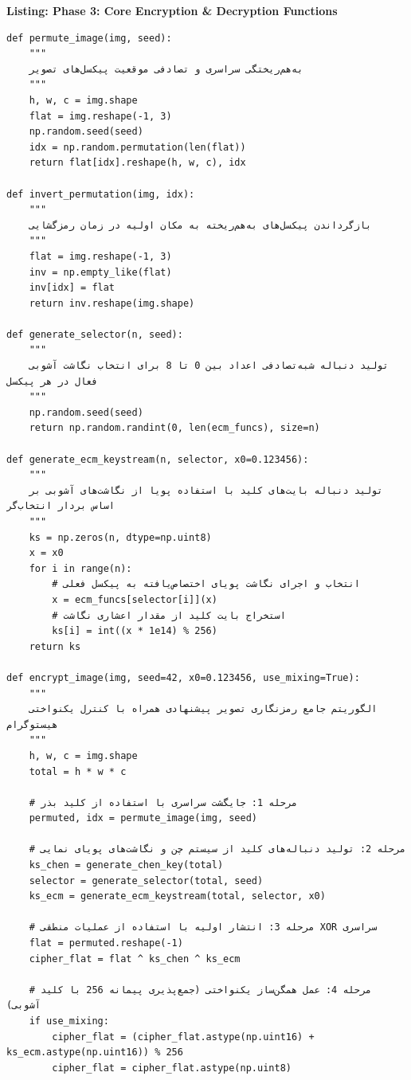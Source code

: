 \begin{latin}
\noindent\textbf{Listing: Phase 3: Core Encryption \& Decryption Functions}
\begin{verbatim}
def permute_image(img, seed):
    """
    به‌هم‌ریختگی سراسری و تصادفی موقعیت پیکسل‌های تصویر
    """
    h, w, c = img.shape
    flat = img.reshape(-1, 3)
    np.random.seed(seed)
    idx = np.random.permutation(len(flat))
    return flat[idx].reshape(h, w, c), idx

def invert_permutation(img, idx):
    """
    بازگرداندن پیکسل‌های به‌هم‌ریخته به مکان اولیه در زمان رمزگشایی
    """
    flat = img.reshape(-1, 3)
    inv = np.empty_like(flat)
    inv[idx] = flat
    return inv.reshape(img.shape)

def generate_selector(n, seed):
    """
    تولید دنباله شبه‌تصادفی اعداد بین 0 تا 8 برای انتخاب نگاشت آشوبی فعال در هر پیکسل
    """
    np.random.seed(seed)
    return np.random.randint(0, len(ecm_funcs), size=n)

def generate_ecm_keystream(n, selector, x0=0.123456):
    """
    تولید دنباله بایت‌های کلید با استفاده پویا از نگاشت‌های آشوبی بر اساس بردار انتخاب‌گر
    """
    ks = np.zeros(n, dtype=np.uint8)
    x = x0
    for i in range(n):
        # انتخاب و اجرای نگاشت پویای اختصاص‌یافته به پیکسل فعلی
        x = ecm_funcs[selector[i]](x)
        # استخراج بایت کلید از مقدار اعشاری نگاشت
        ks[i] = int((x * 1e14) % 256)
    return ks

def encrypt_image(img, seed=42, x0=0.123456, use_mixing=True):
    """
    الگوریتم جامع رمزنگاری تصویر پیشنهادی همراه با کنترل یکنواختی هیستوگرام
    """
    h, w, c = img.shape
    total = h * w * c
    
    # مرحله 1: جایگشت سراسری با استفاده از کلید بذر
    permuted, idx = permute_image(img, seed)
    
    # مرحله 2: تولید دنباله‌های کلید از سیستم چن و نگاشت‌های پویای نمایی
    ks_chen = generate_chen_key(total)
    selector = generate_selector(total, seed)
    ks_ecm = generate_ecm_keystream(total, selector, x0)
    
    # مرحله 3: انتشار اولیه با استفاده از عملیات منطقی XOR سراسری
    flat = permuted.reshape(-1)
    cipher_flat = flat ^ ks_chen ^ ks_ecm
    
    # مرحله 4: عمل همگن‌ساز یکنواختی (جمع‌پذیری پیمانه 256 با کلید آشوبی)
    if use_mixing:
        cipher_flat = (cipher_flat.astype(np.uint16) + ks_ecm.astype(np.uint16)) % 256
        cipher_flat = cipher_flat.astype(np.uint8)
        

\end{verbatim}
\end{latin}
